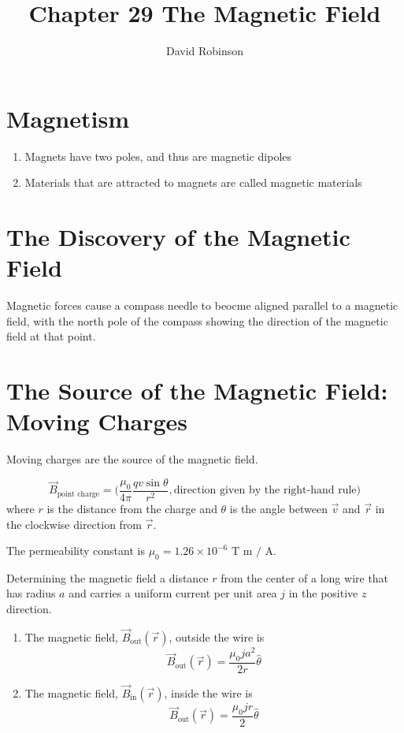 \documentclass{article}
\title{Chapter 29 The Magnetic Field}
\author{David Robinson}
\date{}
\begin{document}
\maketitle

\section*{Magnetism}
\begin{enumerate}
    \item Magnets have two poles, and thus are magnetic dipoles
    \item Materials that are attracted to magnets are called magnetic materials
\end{enumerate}

\section*{The Discovery of the Magnetic Field}
Magnetic forces cause a compass needle to beocme aligned parallel to a magnetic field, with the
north pole of the compass showing the direction of the magnetic field at that point.

\section*{The Source of the Magnetic Field: Moving Charges}
Moving charges are the source of the magnetic field.

\[\vec{B}_\text{point charge}=\Big(\frac{\mu_0}{4\pi}\frac{qv\sin \theta}{r^2},
\text{direction given by the right-hand rule}\Big)\]
where $r$ is the distance from the charge and $\theta$ is the angle between $\vec{v}$ and
$\vec{r}$ in the clockwise direction from $\vec{r}$.

\vspace{1em}

The permeability constant is $\mu_0 = 1.26\times 10^{-6} \text{ T m / A}$.

\vspace{1em}

Determining the magnetic field a distance $r$ from the center of a long wire that has radius $a$
and carries a uniform current per unit area $j$ in the positive $z$ direction.
\begin{enumerate}
    \item The magnetic field, $\vec{B}_\text{out}(\vec{r})$, outside the wire is
    \[\vec{B}_\text{out}(\vec{r})=\frac{\mu_0j a^2}{2r}\hat{\theta}\]
    \item The magnetic field, $\vec{B}_\text{in}(\vec{r})$, inside the wire is
    \[\vec{B}_\text{out}(\vec{r})=\frac{\mu_0 j r}{2}\hat{\theta}\]
\end{enumerate}
\end{document}
